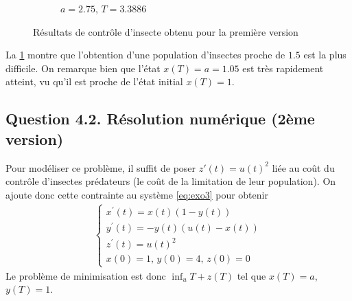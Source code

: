 \documentclass[
	french,
	11pt, %
]{fphw}
\begin{document}
\begin{figure}[H]
\begin{subfigure}[b]{0.32\textwidth}
        \caption{$a = 2.75$, $T=3.3886$}
    \end{subfigure}
       \caption{Résultats de contrôle d'insecte obtenu pour la première version}
       \label{fig:TempsMin}
\end{figure}

La \cref{fig:TempsMin} montre que l'obtention d'une population d'insectes proche de $1.5$ est la plus difficile. On remarque bien que l'état $x(T)=a=1.05$ est très rapidement atteint, vu qu'il est proche de l'état initial $x(T)=1$. 

\subsection*{Question 4.2. Résolution numérique (2ème version)}

Pour modéliser ce problème, il suffit de poser $z'(t) = u(t)^2$ liée au coût du contrôle d'insectes prédateurs (le coût de la limitation de leur population). On ajoute donc cette contrainte au système \eqref{eq:exo3} pour obtenir
\begin{align*}
	\begin{cases}
		x^\prime(t) = x(t)(1-y(t)) \\
		y^\prime(t) = -y(t)(u(t)-x(t))\\
		z^\prime(t) = u(t)^2 \\
		x(0)=1,\, y(0)=4, \, z(0)=0
	\end{cases}
\end{align*}
Le problème de minimisation est donc $\inf_{u}{T+z(T)}$ tel que $x(T)=a$, $y(T)=1$.
\end{document}
